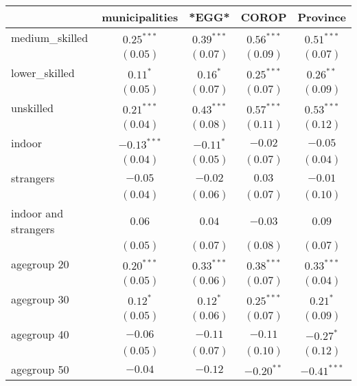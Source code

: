 
\begin{table}
\begin{center}
\begin{tabular}{l c c c c }
\hline
 & municipalities & *EGG* & COROP & Province \\
\hline
medium\_skilled      & $0.25^{***}$  & $0.39^{***}$  & $0.56^{***}$  & $0.51^{***}$  \\
                     & $(0.05)$      & $(0.07)$      & $(0.09)$      & $(0.07)$      \\
lower\_skilled       & $0.11^{*}$    & $0.16^{*}$    & $0.25^{***}$  & $0.26^{**}$   \\
                     & $(0.05)$      & $(0.07)$      & $(0.07)$      & $(0.09)$      \\
unskilled            & $0.21^{***}$  & $0.43^{***}$  & $0.57^{***}$  & $0.53^{***}$  \\
                     & $(0.04)$      & $(0.08)$      & $(0.11)$      & $(0.12)$      \\
indoor               & $-0.13^{***}$ & $-0.11^{*}$   & $-0.02$       & $-0.05$       \\
                     & $(0.04)$      & $(0.05)$      & $(0.07)$      & $(0.04)$      \\
strangers            & $-0.05$       & $-0.02$       & $0.03$        & $-0.01$       \\
                     & $(0.04)$      & $(0.06)$      & $(0.07)$      & $(0.10)$      \\
indoor and strangers & $0.06$        & $0.04$        & $-0.03$       & $0.09$        \\
                     & $(0.05)$      & $(0.07)$      & $(0.08)$      & $(0.07)$      \\
agegroup 20          & $0.20^{***}$  & $0.33^{***}$  & $0.38^{***}$  & $0.33^{***}$  \\
                     & $(0.05)$      & $(0.06)$      & $(0.07)$      & $(0.04)$      \\
agegroup 30          & $0.12^{*}$    & $0.12^{*}$    & $0.25^{***}$  & $0.21^{*}$    \\
                     & $(0.05)$      & $(0.06)$      & $(0.07)$      & $(0.09)$      \\
agegroup 40          & $-0.06$       & $-0.11$       & $-0.11$       & $-0.27^{*}$   \\
                     & $(0.05)$      & $(0.07)$      & $(0.10)$      & $(0.12)$      \\
agegroup 50          & $-0.04$       & $-0.12$       & $-0.20^{**}$  & $-0.41^{***}$ \\

\end{tabular}
\end{center}
\end{table}
